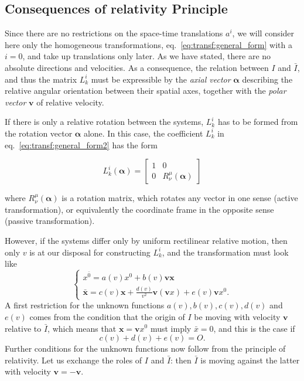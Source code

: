 \subsection{Consequences of relativity Principle}
Since there are no restrictions on the space-time translations $ a^i $, we will
consider here only the homogeneous transformations, eq.~\eqref{eq:transf:general_form} with a $ i = 0 $, and take up translations only later. As we have stated, there are no absolute directions and velocities. As a consequence, the relation between $ I $ and $ \bar{I} $, and thus the matrix $ L^i_k $ must be expressible by the \emph{axial vector} $ \mathbf{\alpha} $ describing the relative angular orientation between their spatial axes, together with the \emph{polar vector} $ \mathbf{v} $ of relative velocity.

If there is only a relative rotation between the systems, $ L^i_k $ has to be formed from the rotation vector $ \mathbf{\alpha} $ alone. In this case, the coefficient $ L^i_k $ in eq.~\eqref{eq:transf:general_form2} has the form

\[L^i_k(\mathbf{\alpha}) ={\begin{bmatrix}1&0\\0&R^{\mu}_{\nu}(\mathbf{\alpha})\end{bmatrix}} \]

where $ R^{\mu}_{\nu}(\mathbf{\alpha}) $ is a rotation matrix, which rotates any vector in one sense (active transformation), or equivalently the coordinate frame in the opposite sense (passive transformation). 

However, if the systems differ only by uniform rectilinear relative motion, then
only $ v $ is at our disposal for constructing $ L^i_k $, and the transformation must look like
\[\begin{cases}
x^{\bar{0}}=a(v)x^0+b(v)\mathbf{v}\mathbf{x}\\
\bar{\mathbf{x}}=c(v)\mathbf{x}+\frac{d(v)}{v^2}\mathbf{v}(\mathbf{v}x)+e(v)\mathbf{v}x^0.
\end{cases} \]
A first restriction for the unknown functions $ a(v), b(v), c(v), d(v) $ and $ e(v) $ comes from the condition that the origin of $ I $ be moving with velocity $ \mathbf{v} $ relative to $ \bar{I} $, which means that $ \mathbf{x} = \mathbf{v}x^0 $ must imply $ \bar{x} = 0 $, and this is the case if 
\begin{equation}
c(v)+ d(v) + e(v)=O.
\end{equation}
Further conditions for the unknown functions now follow from the principle of
relativity. Let us exchange the roles of $ I $ and $ \bar{I} $: then $ \bar{I} $ is moving against the latter with velocity $ \mathbf{v} = -\mathbf{v} $.

